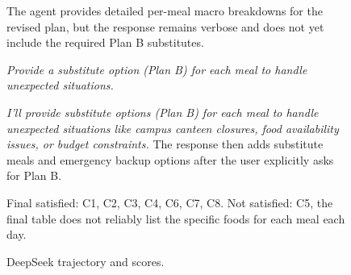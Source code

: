 \begin{figure}[h]
{    
    The agent provides detailed per-meal macro breakdowns for the revised plan, but the response remains verbose and does not yet include the required Plan B substitutes.

    \vspace{3pt}
    \emph{Provide a substitute option (Plan B) for each meal to handle unexpected situations.}

    \emph{I'll provide substitute options (Plan B) for each meal to handle unexpected situations like campus canteen closures, food availability issues, or budget constraints.}
    The response then adds substitute meals and emergency backup options after the user explicitly asks for Plan B.

    \vspace{5pt}
    \hspace{3pt}

    \vspace{3pt}
    \noindent{}
    Final satisfied: C1, C2, C3, C4, C6, C7, C8.
    Not satisfied: C5, the final table does not reliably list the specific foods for each meal each day.
    }
    \caption{DeepSeek trajectory and scores.}
    \label{fig:case_zhangshunkai_1_deepseek_trajectory}
\end{figure}

